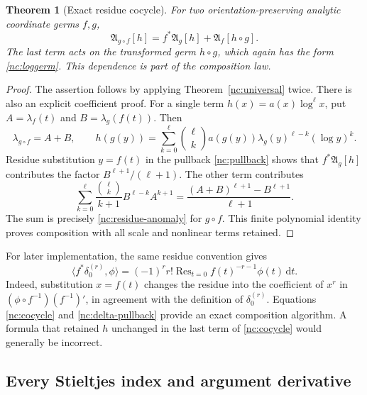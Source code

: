\documentclass[11pt,a4paper]{article}
\numberwithin{equation}{section}
\newtheorem{theorem}{Theorem}[section]
\theoremstyle{definition}
\theoremstyle{remark}
\DeclareMathOperator{\Res}{Res}
\newcommand{\dd}{\,\mathrm d}
\begin{document}
\begin{theorem}[Exact residue cocycle]
\label{nc:composition}
For two orientation-preserving analytic coordinate germs $f,g$,
\begin{equation}\label{nc:cocycle}
 \boxed{\quad
 \mathfrak A_{g\circ f}[h]
    =f^*\mathfrak A_g[h]+\mathfrak A_f[h\circ g].
 \quad}
\end{equation}
The last term acts on the transformed germ $h\circ g$, which again has
the form \eqref{nc:loggerm}. This dependence is part of the composition
law.
\end{theorem}

\begin{proof}
The assertion follows by applying Theorem~\ref{nc:universal} twice.
There is also an explicit coefficient proof. For a single term
$h(x)=a(x)\log^\ell x$, put
$A=\lambda_f(t)$ and $B=\lambda_g(f(t))$. Then
\[
 \lambda_{g\circ f}=A+B,\qquad
 h(g(y))=\sum_{k=0}^\ell\binom\ell k
   a(g(y))\lambda_g(y)^{\ell-k}(\log y)^k.
\]
Residue substitution $y=f(t)$ in the pullback
\eqref{nc:pullback} shows that $f^*\mathfrak A_g[h]$ contributes the
factor $B^{\ell+1}/(\ell+1)$. The other term contributes
\[
 \sum_{k=0}^\ell\frac{\binom\ell k}{k+1}B^{\ell-k}A^{k+1}
 =\frac{(A+B)^{\ell+1}-B^{\ell+1}}{\ell+1}.
\]
The sum is precisely \eqref{nc:residue-anomaly} for $g\circ f$.
This finite polynomial identity proves composition with all scale and
nonlinear terms retained.
\end{proof}

For later implementation, the same residue convention gives
\begin{equation}\label{nc:delta-pullback}
 \langle f^*\delta_0^{(r)},\phi\rangle
   =(-1)^rr!\Res_{t=0}f(t)^{-r-1}\phi(t)\dd t.
\end{equation}
Indeed, substitution $x=f(t)$ changes the residue into the coefficient
of $x^r$ in $(\phi\circ f^{-1})(f^{-1})'$, in agreement with the
definition of $\delta_0^{(r)}$. Equations
\eqref{nc:cocycle} and \eqref{nc:delta-pullback} provide an exact
composition algorithm. A formula that retained $h$ unchanged in the
last term of \eqref{nc:cocycle} would generally be incorrect.

\subsection{Every Stieltjes index and argument derivative}
\end{document}
